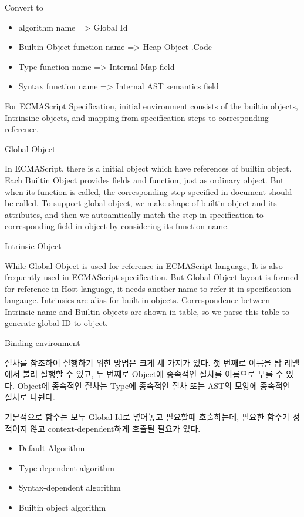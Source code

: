 Convert to
\begin{itemize}
\item algorithm name => Global Id
\item Builtin Object function name => Heap Object .Code
\item Type function name => Internal Map field
\item Syntax function name => Internal AST semantics field
\end{itemize}


For ECMAScript Specification, initial environment consists of the builtin objects, Intrinsinc objects, and mapping from specification steps to corresponding reference.

 Global Object

 In ECMAScript, there is a initial object which have references of builtin object. Each Builtin Object provides fields and function, just as ordinary object. But when its function is called,
 the corresponding step specified in document should be called. To support global object, we make shape of builtin object and its attributes, and then we autoamtically match the step in specification to corresponding field in object by considering its function name.
 
 Intrinsic Object

 While Global Object is used for reference in ECMAScript language, It is also frequently used in ECMAScript specification. But Global Object layout is
 formed for reference in Host language, it needs another name to refer it in specification langauge. Intrinsics are alias for built-in objects. 
 Correspondence between Intrinsic name and Builtin objects are shown in table, so we parse this table to generate global ID to object.
 
 Binding environment

 절차를 참조하여 실행하기 위한 방법은 크게 세 가지가 있다. 첫 번째로 이름을 탑 레벨에서 불러 실행할 수 있고, 두 번째로 Object에 종속적인 절차를 이름으로 부를 수 있다. Object에 종속적인 절차는 Type에 종속적인 절차 또는 AST의 모양에 종속적인 절차로 나뉜다.
 
 기본적으로 함수는 모두 Global Id로 넣어놓고 필요할때 호출하는데, 필요한 함수가 정적이지 않고
context-dependent하게 호출될 필요가 있다.

 
\begin{itemize}
  \item Default Algorithm
  \item Type-dependent algorithm
  \item Syntax-dependent algorithm
  \item Builtin object algorithm
  \end{itemize}
  


